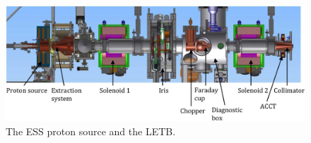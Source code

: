 \begin{figure}[!ht]
	\begin{center}
		\includegraphics[width=\textwidth]{02_BeamDiag/figures/fig000_LEBT_ESS}
	\end{center}
	\caption[The ESS proton source and the LETB]{The ESS proton source and the LETB.}
	\label{chap2:fig:LEBT_ESS}
\end{figure}
